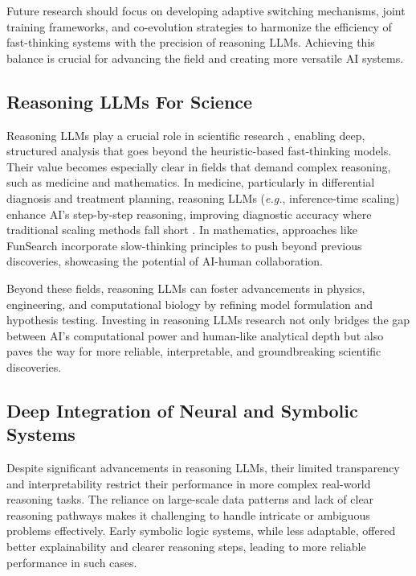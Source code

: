 Future research should focus on developing adaptive switching mechanisms, joint training frameworks, and co-evolution strategies to harmonize the efficiency of fast-thinking systems with the precision of reasoning LLMs. 
Achieving this balance is crucial for advancing the field and creating more versatile AI systems.




\subsection{Reasoning LLMs For Science}\label{src_science}

Reasoning LLMs play a crucial role in scientific research \cite{zheng2024openresearcher}, enabling deep, structured analysis that goes beyond the heuristic-based fast-thinking models. 
Their value becomes especially clear in fields that demand complex reasoning, such as medicine and mathematics. 
In medicine, particularly in differential diagnosis and treatment planning, reasoning LLMs (\emph{e.g.}, inference-time scaling) enhance AI's step-by-step reasoning, improving diagnostic accuracy where traditional scaling methods fall short \cite{huang2025o1}. 
In mathematics, approaches like FunSearch \cite{romera2024mathematical} incorporate slow-thinking principles to push beyond previous discoveries, showcasing the potential of AI-human collaboration.

Beyond these fields, reasoning LLMs can foster advancements in physics, engineering, and computational biology by refining model formulation and hypothesis testing. 
Investing in reasoning LLMs research not only bridges the gap between AI's computational power and human-like analytical depth but also paves the way for more reliable, interpretable, and groundbreaking scientific discoveries.

\subsection{Deep Integration of Neural and Symbolic Systems}\label{llm_symbol}


Despite significant advancements in reasoning LLMs, their limited transparency and interpretability restrict their performance in more complex real-world reasoning tasks. 
The reliance on large-scale data patterns and lack of clear reasoning pathways makes it challenging to handle intricate or ambiguous problems effectively. 
Early symbolic logic systems, while less adaptable, offered better explainability and clearer reasoning steps, leading to more reliable performance in such cases.

